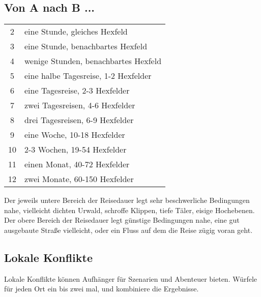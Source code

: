 \documentclass[11pt]{wbzine}
\begin{document}
\subsection{Von A nach B ...}

\begin{tabularx}{\columnwidth}{cZ}
2 & eine Stunde, gleiches Hexfeld\\
3 & eine Stunde, benachbartes Hexfeld\\
4 & wenige Stunden, benachbartes Hexfeld\\
5 & eine halbe Tagesreise, 1-2 Hexfelder\\
6 & eine Tagesreise, 2-3 Hexfelder\\
7 & zwei Tagesreisen, 4-6 Hexfelder\\
8 & drei Tagesreisen, 6-9 Hexfelder\\
9 & eine Woche, 10-18 Hexfelder\\
10 & 2-3 Wochen, 19-54 Hexfelder\\
11 & einen Monat, 40-72 Hexfelder\\
12 & zwei Monate, 60-150 Hexfelder\\
\end{tabularx}

Der jeweils untere Bereich der Reisedauer legt sehr beschwerliche
Bedingungen nahe, vielleicht dichten Urwald, schroffe Klippen, tiefe
Täler, eisige Hochebenen. Der obere Bereich der Reisedauer legt günstige
Bedingungen nahe, eine gut ausgebaute Straße vielleicht, oder ein Fluss
auf dem die Reise zügig voran geht.

\subsection{Lokale Konflikte}

Lokale Konflikte können Aufhänger für Szenarien und Abenteuer
bieten. Würfele für jeden Ort ein bis zwei mal, und kombiniere die
Ergebnisse.
\end{document}

